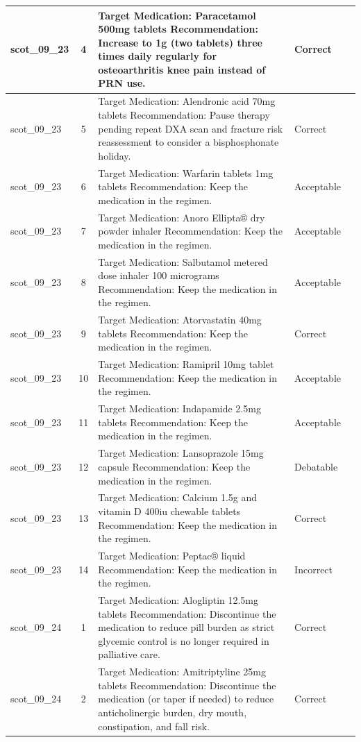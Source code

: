\begin{longtable}{|p{1.45cm}|c|p{10.2cm}|p{1.55cm}|p{2.3cm}|}
\hline
scot\_09\_23 & 4 & Target Medication: Paracetamol 500mg tablets Recommendation: Increase to 1g (two tablets) three times daily regularly for osteoarthritis knee pain instead of PRN use. & Correct &  \\
\hline
scot\_09\_23 & 5 & Target Medication: Alendronic acid 70mg tablets Recommendation: Pause therapy pending repeat DXA scan and fracture risk reassessment to consider a bisphosphonate holiday. & Correct &  \\
\hline
scot\_09\_23 & 6 & Target Medication: Warfarin tablets 1mg tablets Recommendation: Keep the medication in the regimen. & Acceptable &  \\
\hline
scot\_09\_23 & 7 & Target Medication: Anoro Ellipta® dry powder inhaler Recommendation: Keep the medication in the regimen. & Acceptable &  \\
\hline
scot\_09\_23 & 8 & Target Medication: Salbutamol metered dose inhaler 100 micrograms Recommendation: Keep the medication in the regimen. & Acceptable &  \\
\hline
scot\_09\_23 & 9 & Target Medication: Atorvastatin 40mg tablets Recommendation: Keep the medication in the regimen. & Correct &  \\
\hline
scot\_09\_23 & 10 & Target Medication: Ramipril 10mg tablet Recommendation: Keep the medication in the regimen. & Acceptable &  \\
\hline
scot\_09\_23 & 11 & Target Medication: Indapamide 2.5mg tablets Recommendation: Keep the medication in the regimen. & Acceptable &  \\
\hline
scot\_09\_23 & 12 & Target Medication: Lansoprazole 15mg capsule Recommendation: Keep the medication in the regimen. & Debatable &  \\
\hline
scot\_09\_23 & 13 & Target Medication: Calcium 1.5g and vitamin D 400iu chewable tablets Recommendation: Keep the medication in the regimen. & Correct &  \\
\hline
scot\_09\_23 & 14 & Target Medication: Peptac® liquid Recommendation: Keep the medication in the regimen. & Incorrect &  \\
\hline
scot\_09\_24 & 1 & Target Medication: Alogliptin 12.5mg tablets Recommendation: Discontinue the medication to reduce pill burden as strict glycemic control is no longer required in palliative care. & Correct &  \\
\hline
scot\_09\_24 & 2 & Target Medication: Amitriptyline 25mg tablets Recommendation: Discontinue the medication (or taper if needed) to reduce anticholinergic burden, dry mouth, constipation, and fall risk. & Correct &  \\

\end{longtable}
